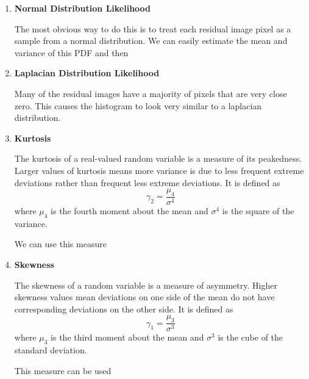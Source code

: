 \begin{enumerate}
\item{\textbf{Normal Distribution Likelihood}}

The most obvious way to do this is to treat each residual image pixel as a sample from a normal distribution.  We can easily estimate the mean and variance of this PDF and then 

\item{\textbf{Laplacian Distribution Likelihood}}

Many of the residual images have a majority of pixels that are very close zero.  This causes the histogram to look very similar to a laplacian distribution.

\item{\textbf{Kurtosis}}

The kurtosis of a real-valued random variable is a measure of its peakedness.  Larger values of kurtosis means more variance is due to less frequent extreme deviations rather than frequent less extreme deviations.  It is defined as $$\gamma_2=\frac{\mu_4}{\sigma^4}$$ where $\mu_4$ is the fourth moment about the mean and $\sigma^4$ is the square of the variance.

We can use this measure 

\item{\textbf{Skewness}}

The skewness of a random variable is a measure of asymmetry.  Higher skewness values mean deviations on one side of the mean do not have corresponding deviations on the other side.  It is defined as $$\gamma_1=\frac{\mu_3}{\sigma^3}$$ where $\mu_3$ is the third moment about the mean and $\sigma^3$ is the cube of the standard deviation.

This measure can be used


\end{enumerate}



